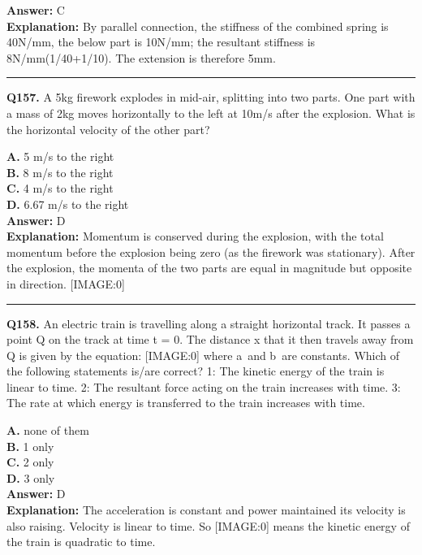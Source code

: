 \documentclass[12pt]{article}
\begin{document}
\textbf{Answer:} C \\
\textbf{Explanation:} By parallel connection, the stiffness of the combined spring is 40N/mm, the below part is 10N/mm; the resultant stiffness is 8N/mm(1/40+1/10). The extension is therefore 5mm.

\hrule
\vspace{1em}


\noindent
\textbf{Q157.} A 5kg firework explodes in mid-air, splitting into two parts. One part with a mass of 2kg moves horizontally to the left at 10m/s after the explosion. What is the horizontal velocity of the other part?



\textbf{A.} 5 m/s to the right \\
\textbf{B.} 8 m/s to the right \\
\textbf{C.} 4 m/s to the right \\
\textbf{D.} 6.67 m/s to the right \\

\textbf{Answer:} D \\
\textbf{Explanation:} Momentum is conserved during the explosion, with the total momentum before the explosion being zero (as the firework was stationary). After the explosion, the momenta of the two parts are equal in magnitude but opposite in direction.
[IMAGE:0]

\hrule
\vspace{1em}


\noindent
\textbf{Q158.} An electric train is travelling along a straight horizontal track. It passes a point Q on the track at time t = 0. The distance x that it then travels away from Q is given by the equation:
[IMAGE:0]
where a and b are constants.
Which of the following statements is/are correct?
1: The kinetic energy of the train is linear to time.
2: The resultant force acting on the train increases with time.
3: The rate at which energy is transferred to the train increases with time.



\textbf{A.} none of them \\
\textbf{B.} 1 only \\
\textbf{C.} 2 only \\
\textbf{D.} 3 only \\

\textbf{Answer:} D \\
\textbf{Explanation:} The acceleration is constant and power maintained its velocity is also raising. Velocity is linear to time. So
[IMAGE:0]
means the kinetic energy of the train is quadratic to time.
\end{document}
